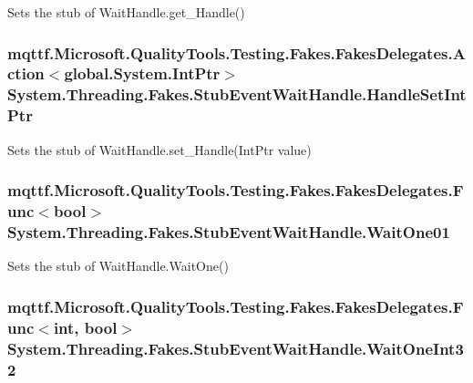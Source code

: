 Sets the stub of Wait\-Handle.\-get\-\_\-\-Handle()

\hypertarget{class_system_1_1_threading_1_1_fakes_1_1_stub_event_wait_handle_a3f0621f746fe7504950008260fde1c7f}{
\subsubsection[{Handle\-Set\-Int\-Ptr}]{\setlength{\rightskip}{0pt plus 5cm}mqttf.\-Microsoft.\-Quality\-Tools.\-Testing.\-Fakes.\-Fakes\-Delegates.\-Action$<$global.\-System.\-Int\-Ptr$>$ System.\-Threading.\-Fakes.\-Stub\-Event\-Wait\-Handle.\-Handle\-Set\-Int\-Ptr}}\label{class_system_1_1_threading_1_1_fakes_1_1_stub_event_wait_handle_a3f0621f746fe7504950008260fde1c7f}


Sets the stub of Wait\-Handle.\-set\-\_\-\-Handle(\-Int\-Ptr value)

\hypertarget{class_system_1_1_threading_1_1_fakes_1_1_stub_event_wait_handle_a558adc7bb597472cc62f452f4394454b}{
\subsubsection[{Wait\-One01}]{\setlength{\rightskip}{0pt plus 5cm}mqttf.\-Microsoft.\-Quality\-Tools.\-Testing.\-Fakes.\-Fakes\-Delegates.\-Func$<$bool$>$ System.\-Threading.\-Fakes.\-Stub\-Event\-Wait\-Handle.\-Wait\-One01}}\label{class_system_1_1_threading_1_1_fakes_1_1_stub_event_wait_handle_a558adc7bb597472cc62f452f4394454b}


Sets the stub of Wait\-Handle.\-Wait\-One()

\hypertarget{class_system_1_1_threading_1_1_fakes_1_1_stub_event_wait_handle_a1f52552b8f4a62edb713e2fa2a7b74e1}{
\subsubsection[{Wait\-One\-Int32}]{\setlength{\rightskip}{0pt plus 5cm}mqttf.\-Microsoft.\-Quality\-Tools.\-Testing.\-Fakes.\-Fakes\-Delegates.\-Func$<$int, bool$>$ System.\-Threading.\-Fakes.\-Stub\-Event\-Wait\-Handle.\-Wait\-One\-Int32}}\label{class_system_1_1_threading_1_1_fakes_1_1_stub_event_wait_handle_a1f52552b8f4a62edb713e2fa2a7b74e1}



